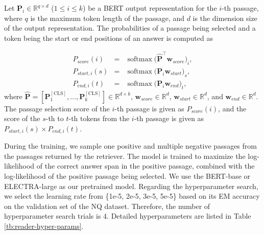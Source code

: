 \documentclass[11pt,a4paper]{article}
\DeclareMathOperator{\softmax}{softmax}
\begin{document}
Let $\mathbf{P}_{i} \in \mathbb{R}^{q \times d}$ ($1 \leq i \leq k$) be a BERT output representation for the $i$-th passage, where $q$ is the maximum token length of the passage, and $d$ is the dimension size of the output representation.
The probabilities of a passage being selected and  a token being the start or end positions of an answer is computed as

\begin{eqnarray}
  P_{score}(i) &=& \softmax\big( \mathbf{\hat{P}}^{\top} \mathbf{w}_{score}  \big)_i,\\
  P_{start,i}(s)  &=& \softmax \big(\mathbf{P}_{i} \mathbf{w}_{start}\big)_s, \\
  P_{end,i}(t) &=& \softmax \big(\mathbf{P}_{i} \mathbf{w}_{end}\big)_t,
\end{eqnarray}
where $\mathbf{\hat{P}} = [\mathbf{P}_1^{\mathrm{[CLS]}}, \ldots, \mathbf{P}_k^{\mathrm{[CLS]}}] \in \mathbb{R}^{d \times k}$, $\mathbf{w}_{score} \in \mathbb{R}^{d}$, $\mathbf{w}_{start} \in \mathbb{R}^{d}$, and $\mathbf{w}_{end} \in \mathbb{R}^{d}$.
The passage selection score of the $i$-th passage is given as $P_{score}(i)$, and the score of the $s$-th to $t$-th tokens from the $i$-th passage is given as $P_{{start},i}(s) \times P_{{end},i}(t)$.

During the training, we sample one positive and multiple negative passages from the passages returned by the retriever.
The model is trained to maximize the log-likelihood of the correct answer span in the positive passage,  combined with the log-likelihood of the positive passage being selected.
We use the BERT-base or ELECTRA-large as our pretrained model.
Regarding the hyperparameter search, we select the learning rate from \{1e-5, 2e-5, 3e-5, 5e-5\} based on its EM accuracy on the validation set of the NQ dataset.
Therefore, the number of hyperparameter search trials is 4.
Detailed hyperparameters are listed in Table \ref{tb:reader-hyper-params}.
\end{document}
